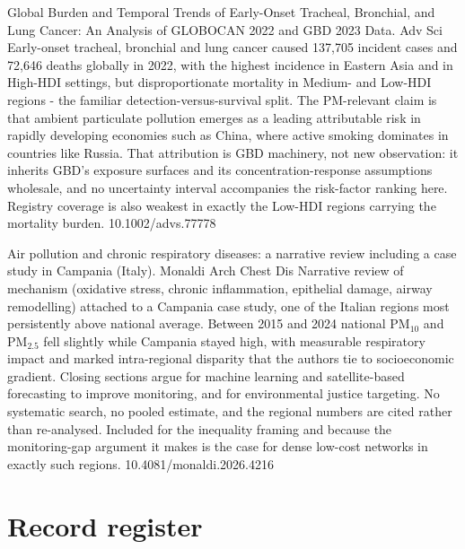\documentclass[10pt]{article}
\begin{document}
{Global Burden and Temporal Trends of Early-Onset Tracheal, Bronchial, and Lung Cancer: An Analysis of GLOBOCAN 2022 and GBD 2023 Data.}
{Adv Sci}
{Early-onset tracheal, bronchial and lung cancer caused 137,705 incident cases and 72,646 deaths globally in 2022, with the highest incidence in Eastern Asia and in High-HDI settings, but disproportionate mortality in Medium- and Low-HDI regions - the familiar detection-versus-survival split. The PM-relevant claim is that ambient particulate pollution emerges as a leading attributable risk in rapidly developing economies such as China, where active smoking dominates in countries like Russia. That attribution is GBD machinery, not new observation: it inherits GBD's exposure surfaces and its concentration-response assumptions wholesale, and no uncertainty interval accompanies the risk-factor ranking here. Registry coverage is also weakest in exactly the Low-HDI regions carrying the mortality burden.}
{10.1002/advs.77778}

{Air pollution and chronic respiratory diseases: a narrative review including a case study in Campania (Italy).}
{Monaldi Arch Chest Dis}
{Narrative review of mechanism (oxidative stress, chronic inflammation, epithelial damage, airway remodelling) attached to a Campania case study, one of the Italian regions most persistently above national average. Between 2015 and 2024 national PM$_{10}$ and PM$_{2.5}$ fell slightly while Campania stayed high, with measurable respiratory impact and marked intra-regional disparity that the authors tie to socioeconomic gradient. Closing sections argue for machine learning and satellite-based forecasting to improve monitoring, and for environmental justice targeting. No systematic search, no pooled estimate, and the regional numbers are cited rather than re-analysed. Included for the inequality framing and because the monitoring-gap argument it makes is the case for dense low-cost networks in exactly such regions.}
{10.4081/monaldi.2026.4216}

\clearpage

\section*{\sffamily\bfseries\color{Deep}Record register}
\vspace{-1.5mm}{\color{Amber}\rule{\linewidth}{1.1pt}}\vspace{2.5mm}


\end{document}
